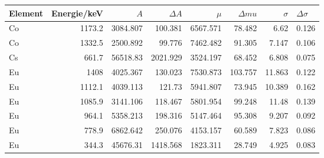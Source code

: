 \documentclass[ngerman,11pt]{article}
\begin{document}
\begin{table}[htbp]
	\centering
	\begin{tabular}{|l|r|r|r|r|r|r|r|}
		\hline
		Element & {Energie/keV} & {$A$} & {$\Delta A$} & {$\mu$} &{$\Delta mu$} & {$\sigma$} & \multicolumn{1}{l}{$\Delta \sigma$} \\\hline
		Co      & 1173.2                          & 3084.807                & 100.381                        & 6567.571                  & 78.482                          & 6.62                         & 0.126                               \\\hline
		Co      & 1332.5                          & 2500.892                & 99.776                         & 7462.482                  & 91.305                          & 7.147                        & 0.106                               \\\hline
		Cs      & 661.7                           & 56518.83                & 2021.929                       & 3524.197                  & 68.452                          & 6.808                        & 0.075                               \\\hline
		Eu      & 1408                            & 4025.367                & 130.023                        & 7530.873                  & 103.757                         & 11.863                       & 0.122                               \\\hline
		Eu      & 1112.1                          & 4039.113                & 121.73                         & 5941.807                  & 73.945                          & 10.389                       & 0.162                               \\\hline
		Eu      & 1085.9                          & 3141.106                & 118.467                        & 5801.954                  & 99.248                          & 11.48                        & 0.139                               \\\hline
		Eu      & 964.1                           & 5358.213                & 198.316                        & 5147.464                  & 95.308                          & 9.207                        & 0.092                               \\\hline
		Eu      & 778.9                           & 6862.642                & 250.076                        & 4153.157                  & 60.589                          & 7.823                        & 0.086                               \\ \hline
		Eu      & 344.3                           & 45676.31                & 1418.568                       & 1823.311                  & 28.749                          & 4.925                        & 0.083                               \\ \hline

\end{tabular}
\end{table}
\end{document}
